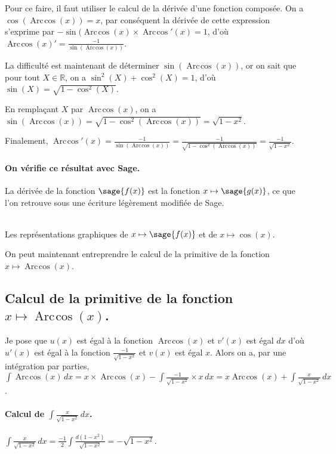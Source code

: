 \documentclass[a4paper,landscape,17pt]{extreport} %
\def\eclaire{\mathbb}
\def\R{\ensuremath{\eclaire R}}
\renewcommand{\arccos}{\mathop{\mathrm{Arc\mspace{2mu}cos}}}
\begin{document}
Pour ce faire, il faut utiliser le calcul de la dérivée d'une fonction composée. On a $\cos(\arccos(x))=x$, par conséquent la dérivée de cette expression s'exprime par $ -\sin(\arccos(x) \times \arccos\nolimits'(x) = 1$, d'où $\arccos(x)' = \frac{-1}{\sin(\arccos(x))} $.

La difficulté est maintenant de déterminer $\sin(\arccos(x))$, or on sait que pour tout $X \in \R$, on a $\sin^2(X) + \cos^2(X) = 1$, d'où $\sin(X) = \sqrt{1-\cos^2(X)}$.

En remplaçant $X$ par $\arccos(x)$, 
on a $\sin(\arccos(x)) = \sqrt{1-\cos^2(\arccos(x))} = \sqrt{1- x^2}$.

Finalement, $\arccos\nolimits'(x) = \frac{-1}{\sin(\arccos(x))} = \frac{-1}{\sqrt{1-\cos^2(\arccos(x))}} =  \frac{-1}{\sqrt{1- x^2}} $.
\paragraph{On vérifie ce résultat avec Sage.}
La dérivée de la fonction $\sage{f(x)}$ est la fonction $x \mapsto \sage{g(x)} $, ce que l'on retrouve sous une écriture légèrement modifiée de Sage.


\begin{center}
\\
Les représentations graphiques de $x \mapsto \sage{f(x)} $ et de $x\mapsto \cos(x)$.
\end{center}

On peut maintenant entreprendre le calcul de la primitive de la  fonction  $x \mapsto \arccos(x) $.

\subsection{Calcul de la primitive de la fonction  $x \mapsto \arccos(x) $.}
Je pose que $u(x)$  est égal à la fonction $\arccos(x)$ et $v'(x)$ est égal $dx$  d'où $u'(x)$  est égal à la fonction $ \frac{-1}{\sqrt{1- x^2}} $ et $v(x)$ est égal $x$.
Alors on a, par une intégration par parties, $\int \arccos(x) \, dx = x \times \arccos(x) -\int \frac{-1}{\sqrt{1- x^2}} \times x \, dx =  x \arccos(x) + \int \frac{x}{\sqrt{1- x^2}} \, dx $.
\paragraph{Calcul de $\int \frac{x}{\sqrt{1- x^2}} \, dx $.}
$\int \frac{x}{\sqrt{1- x^2}} \, dx = \frac{-1}{2} \int \frac{d(1-x^2)}{\sqrt{1- x^2}}= -\sqrt{1- x^2} $.
\end{document}
